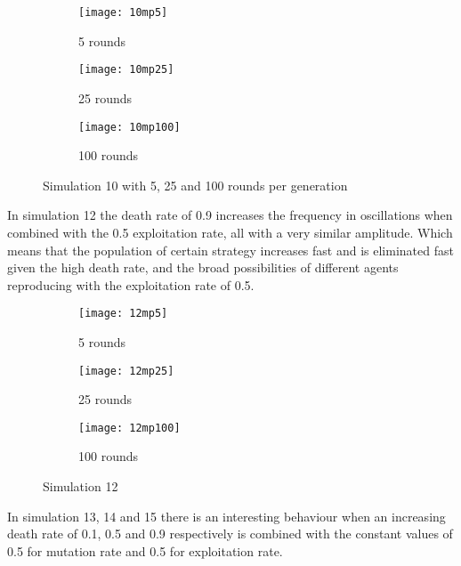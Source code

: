 \begin{figure}[H]       
    \centering
    \begin{subfigure}[b]{0.3\textwidth}
	\centering
	{\texttt{[image: 10mp5]}}   
    	\caption{5 rounds}
	\label{fig:mpsim105}
    \end{subfigure}
    \hfill
    \begin{subfigure}[b]{0.3\textwidth}
	\centering
	{\texttt{[image: 10mp25]}}   
    	\caption{25 rounds}
	\label{fig:mpsim1025}
    \end{subfigure}
    \hfill
    \begin{subfigure}[b]{0.3\textwidth}
	\centering
	{\texttt{[image: 10mp100]}}   
    	\caption{100 rounds}
	\label{fig:mpsim101000}
    \end{subfigure}
    \caption{Simulation 10 with 5, 25 and 100 rounds per generation}
    \label{mpsim10simulations}
\end{figure}


In simulation 12  the death rate of 0.9 increases the frequency in oscillations when combined with the 0.5 exploitation rate, all with a very similar amplitude. Which means that the population of certain strategy increases fast and is eliminated fast given the high death rate, and the broad possibilities of different agents reproducing with the exploitation rate of 0.5.

\begin{figure}[H]       
    \centering
    \begin{subfigure}[b]{0.3\textwidth}
	\centering
	{\texttt{[image: 12mp5]}}   
    	\caption{5 rounds}
	\label{fig:mpsim125}
    \end{subfigure}
    \hfill
    \begin{subfigure}[b]{0.3\textwidth}
	\centering
	{\texttt{[image: 12mp25]}}   
    	\caption{25 rounds}
	\label{fig:mpsim1225}
    \end{subfigure}
    \hfill
    \begin{subfigure}[b]{0.3\textwidth}
	\centering
	{\texttt{[image: 12mp100]}}   
    	\caption{100 rounds}
	\label{fig:mpsim12100}
    \end{subfigure}
    \caption{Simulation 12}
    \label{mpsim12simulations}
\end{figure}

In simulation 13, 14 and 15  there is an interesting behaviour when an increasing death rate of 0.1, 0.5 and 0.9 respectively is combined with the constant values of 0.5 for mutation rate and 0.5 for exploitation rate.

